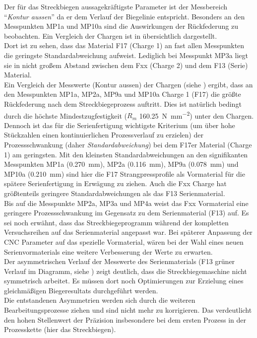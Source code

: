 \documentclass[12pt,a4paper,parskip,twoside,BCOR5mm,headsepline]{scrartcl}
\begin{document}
Der für das Streckbiegen aussagekräftigste Parameter ist der Messbereich "`\emph{Kontur aussen}"' da er dem Verlauf der Biegelinie entspricht. Besonders an den Messpunkten MP1a und MP10a sind die Auswirkungen der Rückfederung zu beobachten. Ein Vergleich der Chargen ist in  übersichtlich dargestellt. \\Dort ist zu sehen, dass das Material F17 (Charge 1) an fast allen Messpunkten die geringste Standardabweichung aufweist. Lediglich bei Messpunkt MP3a liegt sie in nicht großem Abstand zwischen dem Fxx (Charge 2) und dem F13 (Serie) Material.\\Ein Vergleich der Messwerte (Kontur aussen) der Chargen (siehe  ) ergibt, dass an den Messpunkten MP1a, MP2a, MP9a und MP10a  Charge 1 (F17) die größte Rückfederung nach dem Streckbiegeprozess auftritt. Dies ist natürlich bedingt durch die höchste Mindestzugfestigkeit ($R_m$ \SI{160,25}{\newton\per\milli\meter\squared}) unter den Chargen.\\
 Dennoch ist das für die Serienfertigung wichtigste Kriterium (um über hohe Stückzahlen einen kontinuierlichen Prozessverlauf zu erzielen) der Prozessschwankung (daher \emph{Standardabweichung}) bei dem F17er Material (Charge 1) am geringsten. Mit den kleinsten Standardabweichungen an den signifikanten Messpunkten MP1a (\SI{0,270}{\milli\meter}),  MP2a (\SI{0,116}{\milli\meter}),  MP9a (\SI{0,078}{\milli\meter}) und MP10a (\SI{0,210}{\milli\meter}) sind hier die F17 Strangpressprofile als Vormaterial für die spätere Serienfertigung in Erwägung zu ziehen. Auch die Fxx Charge hat größtenteils geringere Standardabweichungen als das F13 Serienmaterial.\\ Bis auf die Messpunkte MP2a, MP3a und MP4a  weist das Fxx Vormaterial eine geringere Prozessschwankung im Gegensatz zu dem Serienmaterial (F13) auf. Es sei noch erwähnt, dass das Streckbiegeprogramm während der kompletten Versuchsreihen auf das Serienmaterial angepasst war. Bei späterer Anpassung der CNC Parameter auf das spezielle Vormaterial,  wären bei der Wahl eines neuen Serienvormaterials eine weitere Verbesserung der Werte zu erwarten.\\ Der asymmetrischen Verlauf der Messwerte des Serienmaterials (F13 grüner Verlauf im Diagramm,   siehe ) zeigt deutlich, dass die Streckbiegemaschine nicht symmetrisch arbeitet. Es müssen dort noch Optimierungen zur Erzielung eines gleichmäßigen Biegeresultats durchgeführt werden.\\
 Die entstandenen Asymmetrien werden sich durch die weiteren Bearbeitungsprozesse ziehen und sind nicht mehr zu korrigieren. Das verdeutlicht den hohen Stellenwert der Präzision insbesondere bei dem ersten Prozess in der Prozesskette (hier das Streckbiegen).
  
\end{document}
